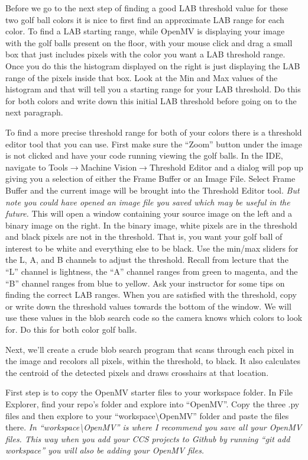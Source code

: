 \documentclass[11pt]{article}
\begin{document}
Before we go to the next step of finding a good LAB threshold value for these two golf ball colors it is nice to first find an approximate LAB range for each color. To find a LAB starting range, while OpenMV is displaying your image with the golf balls present on the floor, with your mouse click and drag a small box that just includes pixels with the color you want a LAB threshold range. Once you do this the histogram displayed on the right is just displaying the LAB range of the pixels inside that box. Look at the Min and Max values of the histogram and that will tell you a starting range for your LAB threshold. Do this for both colors and write down this initial LAB threshold before going on to the next paragraph.

To find a more precise threshold range for both of your colors there is a threshold editor tool that you can use. First make sure the “Zoom” button under the image is not clicked and have your code running viewing the golf balls. In the IDE, navigate to Tools$\rightarrow$Machine Vision$\rightarrow$Threshold Editor and a dialog will pop up giving you a selection of either the Frame Buffer or an Image File. Select Frame Buffer and the current image will be brought into the Threshold Editor tool. \textit{But note you could have opened an image file you saved which may be useful in the future.} This will open a window containing your source image on the left and a binary image on the right. In the binary image, white pixels are in the threshold and black pixels are not in the threshold. That is, you want your golf ball of interest to be white and everything else to be black. Use the min/max sliders for the L, A, and B channels to adjust the threshold. Recall from lecture that the “L” channel is lightness, the “A” channel ranges from green to magenta, and the “B” channel ranges from blue to yellow. Ask your instructor for some tips on finding the correct LAB ranges. When you are satisfied with the threshold, copy or write down the threshold values towards the bottom of the window. We will use these values in the blob search code so the camera knows which colors to look for. Do this for both color golf balls.


Next, we’ll create a crude blob search program that scans through each pixel in the image and recolors all pixels, within the threshold, to black. It also calculates the centroid of the detected pixels and draws crosshairs at that location.

First step is to copy the OpenMV starter files to your workspace folder. In File Explorer, find your repo’s folder and explore into “OpenMV”. Copy the three .py files and then explore to your “workspace\textbackslash{}OpenMV” folder and paste the files there. \textit{In “workspace\textbackslash{}OpenMV” is where I recommend you save all your OpenMV files. This way when you add your CCS projects to Github by running “git add workspace” you will also be adding your OpenMV files.}
\end{document}
